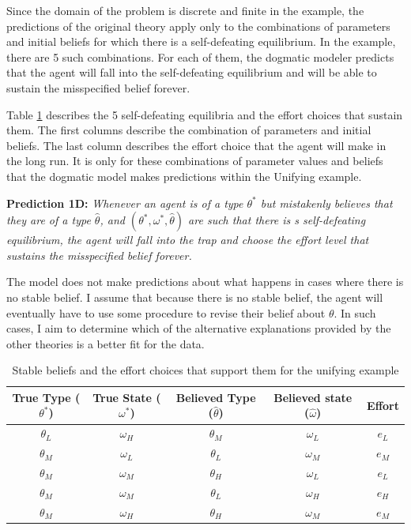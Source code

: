 \documentclass[
  12pt,
]{article}
\begin{document}
Since the domain of the problem is discrete and finite in the example,
the predictions of the original theory apply only to the combinations of
parameters and initial beliefs for which there is a self-defeating
equilibrium. In the example, there are 5 such combinations. For each of
them, the dogmatic modeler predicts that the agent will fall into the
self-defeating equilibrium and will be able to sustain the misspecified
belief forever.

Table \ref{tab:table-dog} describes the 5 self-defeating equilibria and
the effort choices that sustain them. The first columns describe the
combination of parameters and initial beliefs. The last column describes
the effort choice that the agent will make in the long run. It is only
for these combinations of parameter values and beliefs that the dogmatic
model makes predictions within the Unifying example.

\textbf{Prediction 1D:} \emph{Whenever an agent is of a type
\(\theta^*\) but mistakenly believes that they are of a type
\(\hat{\theta}\), and \((\theta^*, \omega^*, \hat{\theta})\) are such
that there is s self-defeating equilibrium, the agent will fall into the
trap and choose the effort level that sustains the misspecified belief
forever.}

The model does not make predictions about what happens in cases where
there is no stable belief. I assume that because there is no stable
belief, the agent will eventually have to use some procedure to revise
their belief about \(\theta\). In such cases, I aim to determine which
of the alternative explanations provided by the other theories is a
better fit for the data.

\begin{table}[htbp]

    \centering
    \begin{tabular}{|c|c|c|c|c|}
        \hline
        \textbf{True Type ($\theta^*$)} & \textbf{True State ($\omega^*$)} & \textbf{Believed Type ($\hat{\theta}$)} & \textbf{Believed state ($\hat{\omega}$)} & \textbf{Effort} \\
        \hline
        \hline
        $\theta_L$ & $\omega_H$ & $\theta_M$ & $\omega_L$ & $e_L$ \\
        \hline
        $\theta_M$ & $\omega_L$ & $\theta_L$ & $\omega_M$ & $e_M$ \\
        \hline
        $\theta_M$ & $\omega_M$ & $\theta_H$ & $\omega_L$ & $e_L$ \\
        \hline
        $\theta_M$ & $\omega_M$ & $\theta_L$ & $\omega_H$ & $e_H$ \\
        \hline
        $\theta_M$ & $\omega_H$ & $\theta_H$ & $\omega_M$ & $e_M$ \\
        \hline
        
        
    \end{tabular}
    \caption{Stable beliefs and the effort choices that support them for the unifying example}
    \label{tab:table-dog}
\end{table}
\end{document}
